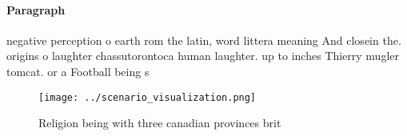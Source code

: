 \documentclass[a4paper]{article}
\begin{document}
\paragraph{Paragraph}
negative perception o earth rom the latin, word littera meaning And closein the. origins o laughter chassutorontoca human laughter. up to inches Thierry mugler tomcat. or a Football being s


\begin{figure}
\centering
\texttt{[image: ../scenario\_visualization.png]}
\caption{Religion being with three canadian provinces brit
}
\end{figure}
 
\end{document}
